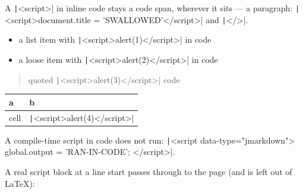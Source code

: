 A \texttt|<script>| in inline code stays a code span, wherever it sits — a paragraph:
\texttt|<script>document.title = 'SWALLOWED'</script>| and \texttt|</>|.

\begin{itemize}
\item a list item with \texttt|<script>alert(1)</script>| in code
\item a loose item with \texttt|<script>alert(2)</script>| in code
\end{itemize}

\begin{quote}
quoted \texttt|<script>alert(3)</script>| code
\end{quote}

\begin{tabular}{ll}
\toprule
a & b \\
\midrule
cell & \texttt|<script>alert(4)</script>| \\
\bottomrule
\end{tabular}

A compile-time script in code does not run: \texttt|<script data-type="jmarkdown"> global.output = 'RAN-IN-CODE'; </script>|.

A real script block at a line start passes through to the page (and is left out
of LaTeX):

